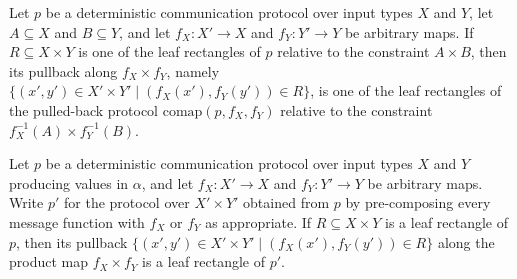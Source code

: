 \begin{theorem}
\label{CommunicationComplexity.Deterministic.Protocol.preimageInputSet_mem_leafRectanglesAux_comap}
\leanok
{}
Let $p$ be a deterministic communication protocol over input types $X$ and $Y$, let $A
\subseteq X$ and $B \subseteq Y$, and let $f_X : X' \to X$ and $f_Y : Y' \to Y$ be
arbitrary maps. If $R \subseteq X \times Y$ is one of the leaf rectangles of $p$
relative to the constraint $A \times B$, then its pullback along $f_X \times f_Y$,
namely $\{(x', y') \in X' \times Y' \mid (f_X(x'), f_Y(y')) \in R\}$, is one of the leaf
rectangles of the pulled-back protocol $\mathrm{comap}(p, f_X, f_Y)$ relative to the
constraint $f_X^{-1}(A) \times f_Y^{-1}(B)$.
\end{theorem}

\begin{theorem}
\label{CommunicationComplexity.Deterministic.Protocol.preimageInputSet_mem_leafRectangles_comap}
\leanok
{}
Let $p$ be a deterministic communication protocol over input types $X$ and $Y$ producing
values in $\alpha$, and let $f_X : X' \to X$ and $f_Y : Y' \to Y$ be arbitrary maps.
Write $p'$ for the protocol over $X' \times Y'$ obtained from $p$ by pre-composing every
message function with $f_X$ or $f_Y$ as appropriate. If $R \subseteq X \times Y$ is a
leaf rectangle of $p$, then its pullback $\{(x', y') \in X' \times Y' \mid (f_X(x'),
f_Y(y')) \in R\}$ along the product map $f_X \times f_Y$ is a leaf rectangle of $p'$.
\end{theorem}

